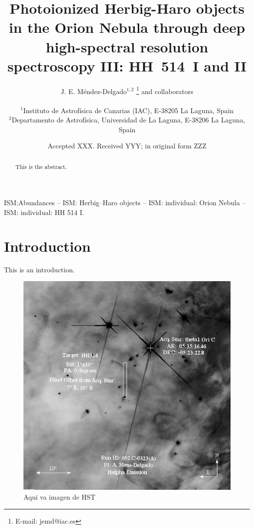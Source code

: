 \documentclass[fleqn,usenatbib]{mnras}
\title[HH~514~I and II in the Orion Nebula]{Photoionized Herbig-Haro objects in the Orion Nebula through deep high-spectral resolution spectroscopy III: HH~514~I and II}
\author[J. E. M\'endez-Delgado et al.]
{J. E. M\'endez-Delgado$^{1,2}$ \thanks{E-mail: jemd@iac.es} and collaborators\\
\\
$^{1}$Instituto de Astrof\'isica de Canarias (IAC), E-38205 La Laguna, Spain\\
$^{2}$Departamento de Astrof\'isica, Universidad de La Laguna, E-38206 La Laguna, Spain}
\date{Accepted XXX. Received YYY; in original form ZZZ}
\begin{document}
\label{firstpage}
\pagerange{\pageref{firstpage}--\pageref{lastpage}}
\maketitle

\begin{abstract}
This is the abstract. 
\end{abstract}

\begin{keywords}
ISM:Abundances – ISM: Herbig–Haro objects – ISM: individual:
Orion Nebula – ISM: individual: HH 514 I.
\end{keywords}



\section{Introduction}
\label{sec:introduction}
This is an introduction.

\begin{figure}
\includegraphics[width=\textwidth]{finding_HH514_halpha.jpg}
\caption{Aqui va imagen de HST}
\label{fig:hst}
\end{figure} 
\end{document}
